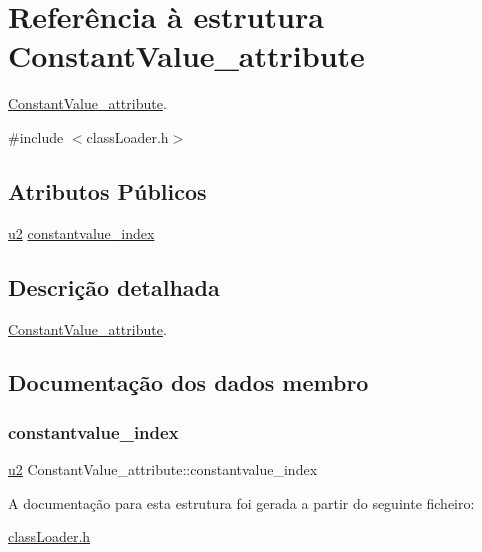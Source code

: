 \hypertarget{struct_constant_value__attribute}{}\section{Referência à estrutura Constant\+Value\+\_\+attribute}
\label{struct_constant_value__attribute}


\hyperlink{struct_constant_value__attribute}{Constant\+Value\+\_\+attribute}.  




{\ttfamily \#include $<$class\+Loader.\+h$>$}

\subsection*{Atributos Públicos}
\begin{DoxyCompactItemize}
\item 
\hyperlink{util_8h_a55ef8d87fd202b8417704c089899c5b9}{u2} \hyperlink{struct_constant_value__attribute_a812157e7121906faf8018ce066d1ea27}{constantvalue\+\_\+index}
\end{DoxyCompactItemize}


\subsection{Descrição detalhada}
\hyperlink{struct_constant_value__attribute}{Constant\+Value\+\_\+attribute}. 

\subsection{Documentação dos dados membro}
\mbox{\label{struct_constant_value__attribute_a812157e7121906faf8018ce066d1ea27}} 
\subsubsection{\texorpdfstring{constantvalue\+\_\+index}{constantvalue\_index}}
{\footnotesize\ttfamily \hyperlink{util_8h_a55ef8d87fd202b8417704c089899c5b9}{u2} Constant\+Value\+\_\+attribute\+::constantvalue\+\_\+index}



A documentação para esta estrutura foi gerada a partir do seguinte ficheiro\+:\begin{DoxyCompactItemize}
\item 
\hyperlink{class_loader_8h}{class\+Loader.\+h}\end{DoxyCompactItemize}
